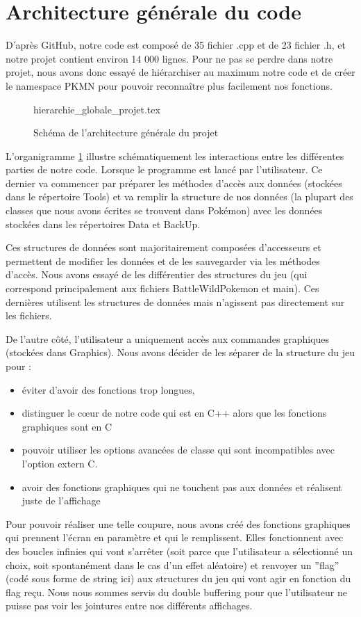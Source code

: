 \documentclass[a4paper,twoside, openany,11pt]{book}
\begin{document}
\newpage

\section{Architecture générale du code}

D'après GitHub, notre code est composé de 35 fichier .cpp et de 23 fichier .h, et notre projet contient environ 14 000 lignes. Pour ne pas se perdre dans notre projet, nous avons donc essayé de hiérarchiser au maximum notre code et de créer le namespace PKMN pour pouvoir reconnaître plus facilement nos fonctions. 

\begin{figure}[!h]\centering
{hierarchie_globale_projet.tex}
\caption{\label{ArchiGenerale}Schéma de l'architecture générale du projet}
\end{figure}

L'organigramme \ref{ArchiGenerale} illustre schématiquement les interactions entre les différentes parties de notre code. Lorsque le programme est lancé par l'utilisateur. Ce dernier va commencer par préparer les méthodes d'accès aux données (stockées dans le répertoire Tools) et va remplir la structure de nos données (la plupart des classes que nous avons écrites se trouvent dans Pokémon) avec les données stockées dans les répertoires Data et BackUp. 

Ces structures de données sont majoritairement composées d'accesseurs et permettent de modifier les données et de les sauvegarder via les méthodes d'accès. Nous avons essayé de les différentier des structures du jeu (qui correspond principalement aux fichiers BattleWildPokemon et main). Ces dernières utilisent les structures de données mais n'agissent pas directement sur les fichiers. 

De l'autre côté, l'utilisateur a uniquement accès aux commandes graphiques (stockées dans Graphics). Nous avons décider de les séparer de la structure du jeu pour :
\begin{itemize}
\item éviter d'avoir des fonctions trop longues,
\item  distinguer le cœur de notre code qui est en C++ alors que les fonctions graphiques sont en C
\item pouvoir utiliser les options avancées de classe qui sont incompatibles avec l'option extern C. 
\item avoir des fonctions graphiques qui ne touchent pas aux données et réalisent juste de l'affichage
\end{itemize}
Pour pouvoir réaliser une telle coupure, nous avons créé des fonctions graphiques qui prennent l'écran en paramètre et qui le remplissent. Elles fonctionnent avec des boucles infinies qui vont s’arrêter (soit parce que l'utilisateur a sélectionné un choix, soit spontanément dans le cas d'un effet aléatoire) et renvoyer un ''flag'' (codé sous forme de string ici) aux structures du jeu qui vont agir en fonction du flag reçu. Nous nous sommes servis du double buffering pour que l'utilisateur ne puisse pas voir les jointures entre nos différents affichages. 
\end{document}
